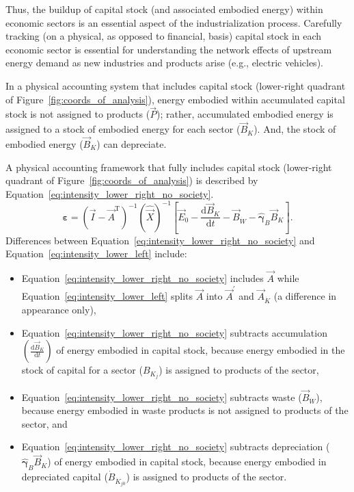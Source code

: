 Thus, the buildup of capital stock (and associated embodied energy) 
within economic sectors is an essential aspect of the industrialization
process.
Carefully tracking (on a physical, as opposed to financial, basis) 
capital stock in each economic sector is essential 
for understanding the network effects of 
upstream energy demand as new industries and products arise 
(e.g., electric vehicles). 

In a physical accounting system that includes capital stock
(lower-right quadrant of Figure~\ref{fig:coords_of_analysis}), 
energy embodied within accumulated capital stock
is not assigned to products ($\vec{P}$); 
rather, accumulated embodied energy is assigned to a stock of embodied energy
for each sector ($\vec{B}_{K}$).
And, the stock of embodied energy ($\vec{B}_{K}$)
can depreciate.

A physical accounting framework that fully includes capital stock
(lower-right quadrant of Figure~\ref{fig:coords_of_analysis}) 
is described by Equation~\ref{eq:intensity_lower_right_no_society}. 
%
\begin{equation} \label{eq:intensity_lower_right_no_society}
	\boldsymbol{\varepsilon}
	= {\left( \vec{I} - {\vec{A}}^{\mathrm{T}} \right)}^{-1}
		{\left( \hat{\vec{X}}  \right)}^{-1}
		\left[ \vec{E}_{0}
			  - \frac{\mathrm{d}\vec{B}_{K}}{\mathrm{d}t}
			  - \vec{B}_{\dot{W}}
			  - \hat{\boldsymbol{\gamma}}_{B} \vec{B}_{K} \right].
\end{equation}
%
Differences between Equation~\ref{eq:intensity_lower_right_no_society}
and Equation~\ref{eq:intensity_lower_left} include:
%
\begin{itemize}
	\item{Equation~\ref{eq:intensity_lower_right_no_society} includes $\vec{A}$
	while Equation~\ref{eq:intensity_lower_left} splits $\vec{A}$ into
	$\vec{A}^{'}$ and $\vec{A}_{\dot{K}}$ (a difference in appearance only),}
	
	\item{Equation~\ref{eq:intensity_lower_right_no_society} subtracts
	accumulation $\left( \frac{\mathrm{d}\vec{B}_{K}}{\mathrm{d}t} \right)$
	of energy embodied in capital stock,
	because energy embodied in the stock of capital 
	for a sector ($B_{K_{j}}$)
	is assigned to products of the sector,}
	
	\item{Equation~\ref{eq:intensity_lower_right_no_society} subtracts
	waste ($\vec{B}_{\dot{W}}$),
	because energy embodied in waste products is not assigned to 
	products of the sector, and}

	\item{Equation~\ref{eq:intensity_lower_right_no_society} subtracts
	depreciation ($\hat{\boldsymbol{\gamma}}_{B} \vec{B}_{K}$)
	of energy embodied in capital stock,
	because energy embodied in depreciated capital ($\dot{B}_{\dot{K}_{j0}}$)
	is assigned to products of the sector.}
\end{itemize}

